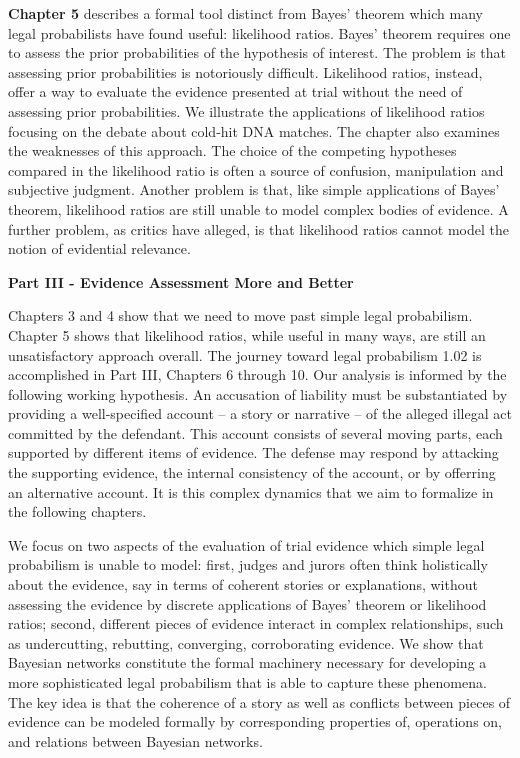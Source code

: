 \documentclass[10pt,dvipsnames,enabledeprecatedfontcommands]{scrartcl}
\begin{document}
\textbf{Chapter 5} describes a formal tool distinct from Bayes' theorem
which many legal probabilists have found useful: likelihood ratios.
Bayes' theorem requires one to assess the prior probabilities of the
hypothesis of interest. The problem is that assessing prior
probabilities is notoriously difficult. Likelihood ratios, instead,
offer a way to evaluate the evidence presented at trial without the need
of assessing prior probabilities. We illustrate the applications of
likelihood ratios focusing on the debate about cold-hit DNA matches. The
chapter also examines the weaknesses of this approach. The choice of the
competing hypotheses compared in the likelihood ratio is often a source
of confusion, manipulation and subjective judgment. Another problem is
that, like simple applications of Bayes' theorem, likelihood ratios are
still unable to model complex bodies of evidence. A further problem, as
critics have alleged, is that likelihood ratios cannot model the notion
of evidential relevance.

\vspace{3mm} \noindent
\textbf{Part III - Evidence Assessment More and Better}

\noindent
Chapters 3 and 4 show that we need to move past simple legal
probabilism. Chapter 5 shows that likelihood ratios, while useful in
many ways, are still an unsatisfactory approach overall. The journey
toward legal probabilism 1.02 is accomplished in Part III, Chapters 6
through 10. Our analysis is informed by the following working
hypothesis. An accusation of liability must be substantiated by
providing a well-specified account -- a story or narrative -- of the
alleged illegal act committed by the defendant. This account consists of
several moving parts, each supported by different items of evidence. The
defense may respond by attacking the supporting evidence, the internal
consistency of the account, or by offerring an alternative account. It
is this complex dynamics that we aim to formalize in the following
chapters.

We focus on two aspects of the evaluation of trial evidence which simple
legal probabilism is unable to model: first, judges and jurors often
think holistically about the evidence, say in terms of coherent stories
or explanations, without assessing the evidence by discrete applications
of Bayes' theorem or likelihood ratios; second, different pieces of
evidence interact in complex relationships, such as undercutting,
rebutting, converging, corroborating evidence. We show that Bayesian
networks constitute the formal machinery necessary for developing a more
sophisticated legal probabilism that is able to capture these phenomena.
The key idea is that the coherence of a story as well as conflicts
between pieces of evidence can be modeled formally by corresponding
properties of, operations on, and relations between Bayesian networks.
\end{document}

